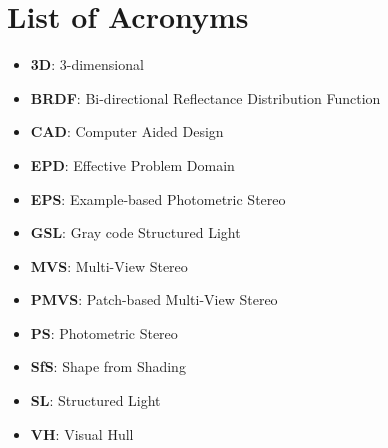 
\chapter{List of Acronyms}

\begin{itemize}
\item \textbf{3D}: 3-dimensional
\item \textbf{BRDF}: Bi-directional Reflectance Distribution Function
\item \textbf{CAD}: Computer Aided Design
\item \textbf{EPD}: Effective Problem Domain
\item \textbf{EPS}: Example-based Photometric Stereo
\item \textbf{GSL}: Gray code Structured Light
\item \textbf{MVS}: Multi-View Stereo
\item \textbf{PMVS}: Patch-based Multi-View Stereo
\item \textbf{PS}: Photometric Stereo
\item \textbf{SfS}: Shape from Shading
\item \textbf{SL}: Structured Light
\item \textbf{VH}: Visual Hull
\end{itemize}